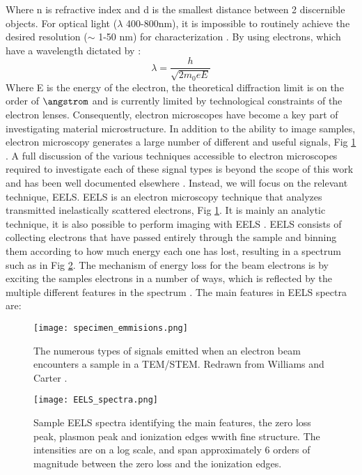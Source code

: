 Where n is refractive index and d is the smallest distance between 2 discernible objects. For optical light ($\lambda$  400-800nm), it is impossible to routinely achieve the desired resolution ($\sim$ 1-50 nm) for characterization \cite{rust_sub-diffraction-limit_2006}.  By using electrons, which have a wavelength dictated by \cite{goldstein_electron_2003}: 
\begin{equation}
\lambda = \frac{h}{\sqrt{2 m_0 e E}}
\end{equation}
Where E is the energy of the electron, the theoretical diffraction limit is on the order of $\angstrom $ and is currently limited by technological constraints of the electron  lenses\cite{goldstein_electron_2003}.  Consequently, electron microscopes have become a key part of investigating material microstructure.  In addition to the ability to image samples, electron microscopy generates a large number of different and useful signals, Fig \ref{specimen_emmisions}
\cite{williams_transmission_1996}.  A full discussion of the various techniques accessible to electron microscopes required to investigate each of these signal types is beyond the scope of this work and has been well documented elsewhere \cite{goldstein_electron_2003,Egerton,williams_transmission_1996,reimer_electron_1998}.  Instead, we will focus on the relevant technique, EELS.  EELS is an electron microscopy technique that analyzes transmitted inelastically scattered electrons, Fig \ref{specimen_emmisions}\cite{Egerton}.  It is mainly an analytic technique, it is also possible to perform imaging with EELS \cite{Egerton}.  EELS consists of collecting electrons that have passed entirely through the sample and binning them according to how much energy each one has lost, resulting in a spectrum such as in Fig \ref{EELS_spectra}.  The mechanism of energy loss for the beam electrons is by exciting the samples electrons in a number of ways, which is reflected by the multiple different features in the spectrum \cite{Egerton}. The main features in EELS spectra are: 
\begin{figure}
	\centering
	\texttt{[image: specimen\_emmisions.png]}
	\caption{The numerous types of signals emitted when an electron beam encounters a sample in a TEM/STEM.   Redrawn from Williams and Carter \cite{williams_transmission_1996}.  }
	\label{specimen_emmisions}
\end{figure}

\begin{figure}
	\centering
	\texttt{[image: EELS\_spectra.png]}
	\caption{Sample EELS spectra identifying the main features, the zero loss peak, plasmon peak and ionization edges wwith fine structure.   The intensities are on a log scale, and span approximately 6 orders of magnitude between the zero loss and the ionization edges.  }
	\label{EELS_spectra}
\end{figure}

